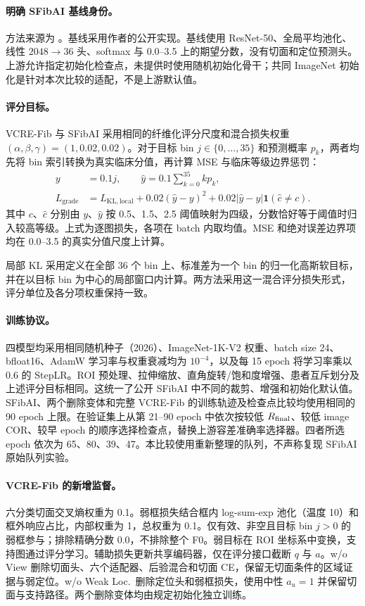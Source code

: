 \paragraph{明确 SFibAI 基线身份。}
方法来源为 \citet{xu2026sfibai}。基线采用作者的公开实现。基线使用 ResNet-50、全局平均池化、线性 $2048\rightarrow36$ 头、softmax 与 0.0--3.5 上的期望分数，没有切面和定位预测头。上游允许指定初始化检查点，未提供时使用随机初始化骨干；共同 ImageNet 初始化是针对本次比较的适配，不是上游默认值。

\paragraph{评分目标。}
VCRE-Fib 与 SFibAI 采用相同的纤维化评分尺度和混合损失权重 $(\alpha,\beta,\gamma)=(1,0.02,0.02)$。对于目标 bin $j\in\{0,\ldots,35\}$ 和预测概率 $p_k$，两者均先将 bin 索引转换为真实临床分值，再计算 MSE 与临床等级边界惩罚：
\[
\begin{aligned}
y&=0.1j,\qquad \hat y=0.1\sum_{k=0}^{35}kp_k,\\
L_{\mathrm{grade}}&=L_{\mathrm{KL,local}}+0.02(\hat y-y)^2
 +0.02|\hat y-y|\mathbf{1}(\hat c\ne c).
\end{aligned}
\]
其中 $c$、$\hat c$ 分别由 $y$、$\hat y$ 按 0.5、1.5、2.5 阈值映射为四级，分数恰好等于阈值时归入较高等级。上式为逐图损失，各项在 batch 内取均值。MSE 和绝对误差边界项均在 0.0--3.5 的真实分值尺度上计算。

局部 KL 采用定义在全部 36 个 bin 上、标准差为一个 bin 的归一化高斯软目标，并在以目标 bin 为中心的局部窗口内计算。两方法采用这一混合评分损失形式，评分单位及各分项权重保持一致。

\paragraph{训练协议。}
四模型均采用相同随机种子（2026）、ImageNet-1K-V2 权重、batch size 24、bfloat16、AdamW 学习率与权重衰减均为 $10^{-4}$，以及每 15 epoch 将学习率乘以 0.6 的 StepLR。ROI 预处理、拉伸缩放、直角旋转/饱和度增强、患者互斥划分及上述评分目标相同。这统一了公开 SFibAI 中不同的裁剪、增强和初始化默认值。SFibAI、两个删除变体和完整 VCRE-Fib 的训练轨迹及检查点比较均使用相同的 90 epoch 上限。在验证集上从第 21--90 epoch 中依次按较低 $R_{\mathrm{final}}$、较低 image COR、较早 epoch 的顺序选择检查点，替换上游容差准确率选择器。四者所选 epoch 依次为 65、80、39、47。本比较使用重新整理的队列，不声称复现 SFibAI 原始队列实验。

\paragraph{VCRE-Fib 的新增监督。}
六分类切面交叉熵权重为 0.1。弱框损失结合框内 log-sum-exp 池化（温度 10）和框外响应占比，内部权重为 1，总权重为 0.1。仅有效、非空且目标 bin $j>0$ 的弱框参与；排除精确分数 0.0，不排除整个 F0。弱目标在 ROI 坐标系中变换，支持图通过评分学习。辅助损失更新共享编码器，仅在评分接口截断 $q$ 与 $a$。w/o View 删除切面头、六个适配器、后验混合和切面 CE，保留无切面条件的区域证据与弱定位。w/o Weak Loc.\ 删除定位头和弱框损失，使用中性 $a_u=1$ 并保留切面与支持路径。两个删除变体均由规定初始化独立训练。

